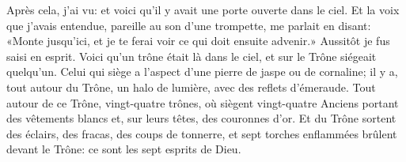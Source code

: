 Après cela, j’ai vu:
	et voici qu’il y avait une porte ouverte dans le ciel.
Et la voix que j’avais entendue, pareille au son d’une trompette, me parlait en disant:
	«Monte jusqu’ici, et je te ferai voir ce qui doit ensuite advenir.»
Aussitôt je fus saisi en esprit.
Voici qu’un trône était là dans le ciel,
	et sur le Trône siégeait quelqu’un.
Celui qui siège a l’aspect d’une pierre de jaspe ou de cornaline;
	il y a, tout autour du Trône, un halo de lumière, avec des reflets d’émeraude.
Tout autour de ce Trône, vingt-quatre trônes,
	où siègent vingt-quatre Anciens portant des vêtements blancs
	et, sur leurs têtes, des couronnes d’or.
Et du Trône sortent des éclairs, des fracas, des coups de tonnerre,
	et sept torches enflammées brûlent devant le Trône:
	ce sont les sept esprits de Dieu.
